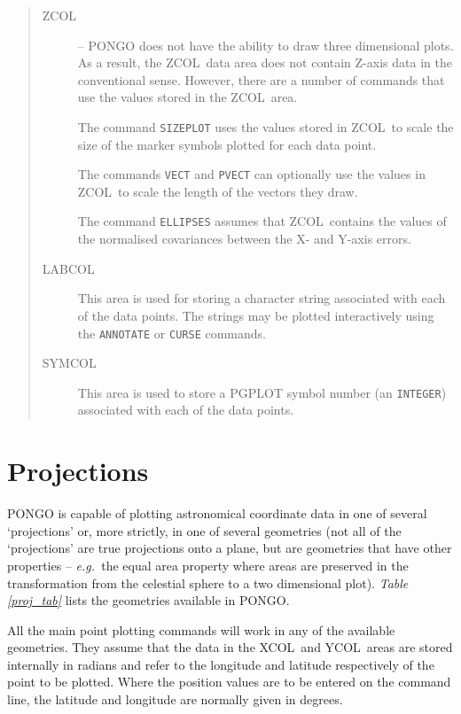 \documentclass[twoside,11pt]{article}
\newcommand{\htmlref}[2]{#1}
\renewcommand{\_}{\texttt{\symbol{95}}}
\newcommand{\eg}{{\em e.g.\ }}
\newcommand{\xcol}{{\sf XCOL}}
\newcommand{\ycol}{{\sf YCOL}}
\newcommand{\zcol}{{\sf ZCOL}}
\newcommand{\symcol}{{\sf SYMCOL}}
\newcommand{\labcol}{{\sf LABCOL}}
\newcommand{\cnam}[1]{{\tt #1}}
\newcommand{\iref} [1]{\htmlref{#1}{#1}}
\begin{document}
\begin{quote}
\begin{description}
\item [\zcol] -- PONGO does not have the ability to draw three
dimensional plots.
As a result, the \zcol\ data area does not contain Z-axis data in the
conventional sense.
However, there are a number of commands that use the values stored in the
\zcol\ area.

The command \cnam{\iref{SIZEPLOT}} uses the values stored in \zcol\ to
scale the size of the marker symbols plotted for each data point.

The commands \cnam{\iref{VECT}} and \cnam{\iref{PVECT}} can optionally
use the values in \zcol\ to scale the length of the vectors they draw.

The command \cnam{\iref{ELLIPSES}} assumes that \zcol\ contains the
values of the normalised covariances between the X- and Y-axis errors.

\item [\labcol] This area is used for storing a character string
associated with each of the data points.  The strings may be plotted
interactively using the \cnam{\iref{ANNOTATE}} or \cnam{\iref{CURSE}}
commands.

\item [\symcol] This area is used to store a PGPLOT symbol number (an
\verb+INTEGER+) associated with each of the data points.

\end{description}
\end{quote}


\section{Projections} \label{proj_sect}

PONGO is capable of plotting astronomical coordinate data in one of several
`projections' or, more strictly, in one of several geometries (not all of the
`projections' are true projections onto a plane, but are geometries that have
other properties -- \eg the equal area property where areas are preserved in
the transformation from the celestial sphere to a two dimensional plot).
{\em Table \ref{proj_tab}} lists the geometries available in PONGO.

All the main point plotting commands will work in any of the available
geometries.
They assume that the data in the \xcol\ and \ycol\ areas are stored internally
in radians and refer to the longitude and latitude respectively of the point to
be plotted.
Where the position values are to be entered on the command line, the latitude
and longitude are normally given in degrees.
\end{document}
